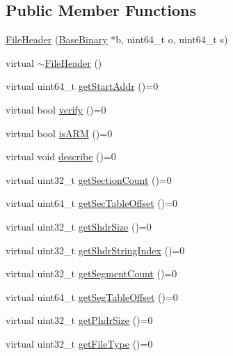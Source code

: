 \subsection*{\-Public \-Member \-Functions}
\begin{DoxyCompactItemize}
\item 
\hyperlink{class_e_p_a_x_1_1_elf_1_1_file_header_a17ca2c27f8cf31a488aaee78b7314ec0}{\-File\-Header} (\hyperlink{class_e_p_a_x_1_1_base_binary}{\-Base\-Binary} $\ast$b, uint64\-\_\-t o, uint64\-\_\-t s)
\item 
virtual \hyperlink{class_e_p_a_x_1_1_elf_1_1_file_header_a3b9e79ac6ed14a656537ed57f1bb1235}{$\sim$\-File\-Header} ()
\item 
virtual uint64\-\_\-t \hyperlink{class_e_p_a_x_1_1_elf_1_1_file_header_abdf6ca1b4c9bb4e4467ad7467c44730e}{get\-Start\-Addr} ()=0
\item 
virtual bool \hyperlink{class_e_p_a_x_1_1_elf_1_1_file_header_a3ca4cd831fa0b4406c0d4864b659c91c}{verify} ()=0
\item 
virtual bool \hyperlink{class_e_p_a_x_1_1_elf_1_1_file_header_a7213d758b36fccdb80c7c3068155cdee}{is\-A\-R\-M} ()=0
\item 
virtual void \hyperlink{class_e_p_a_x_1_1_elf_1_1_file_header_aeb0eeb9a943fe3382edc7e6b10c3d0d5}{describe} ()=0
\item 
virtual uint32\-\_\-t \hyperlink{class_e_p_a_x_1_1_elf_1_1_file_header_a80f2c4f1a3a4caee7bf6b9b6b7d20d92}{get\-Section\-Count} ()=0
\item 
virtual uint64\-\_\-t \hyperlink{class_e_p_a_x_1_1_elf_1_1_file_header_a465040eb608f51272cb889e4fd0c61f1}{get\-Sec\-Table\-Offset} ()=0
\item 
virtual uint32\-\_\-t \hyperlink{class_e_p_a_x_1_1_elf_1_1_file_header_a52a8d42476216d7946039581f570958f}{get\-Shdr\-Size} ()=0
\item 
virtual uint32\-\_\-t \hyperlink{class_e_p_a_x_1_1_elf_1_1_file_header_aa1d63391748e17afd6ee45c9124d3cc1}{get\-Shdr\-String\-Index} ()=0
\item 
virtual uint32\-\_\-t \hyperlink{class_e_p_a_x_1_1_elf_1_1_file_header_a016aee53224e8350e3b8452b1525aad5}{get\-Segment\-Count} ()=0
\item 
virtual uint64\-\_\-t \hyperlink{class_e_p_a_x_1_1_elf_1_1_file_header_a428d1229cb7324696436d62b8c099239}{get\-Seg\-Table\-Offset} ()=0
\item 
virtual uint32\-\_\-t \hyperlink{class_e_p_a_x_1_1_elf_1_1_file_header_a6d180c7702995629f962abd1cce29e2d}{get\-Phdr\-Size} ()=0
\item 
virtual uint32\-\_\-t \hyperlink{class_e_p_a_x_1_1_elf_1_1_file_header_ae36441d44c2fba9f42709566823b7d08}{get\-File\-Type} ()=0
\end{DoxyCompactItemize}
